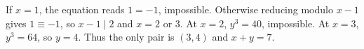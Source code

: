 If $x=1$, the equation reads $1=-1$, impossible. Otherwise reducing modulo $x-1$ gives $1\equiv-1$, so $x-1\mid2$ and $x=2$ or $3$. At $x=2$, $y^3=40$, impossible. At $x=3$, $y^3=64$, so $y=4$. Thus the only pair is $(3,4)$ and $\boxed{x+y=7}$.
